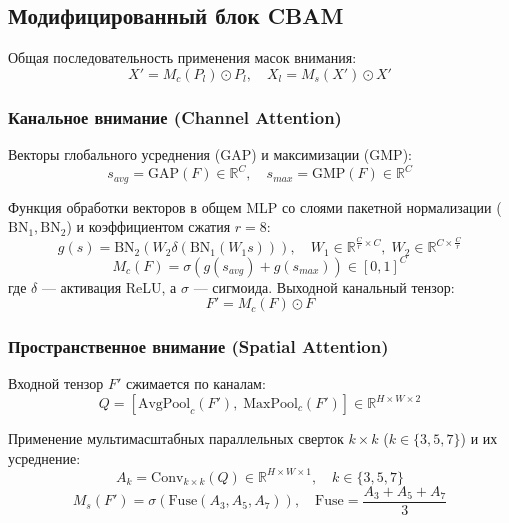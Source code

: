 \documentclass[11pt,a4paper]{article}
\begin{document}
\subsection{Модифицированный блок CBAM}
Общая последовательность применения масок внимания:
\begin{equation}
X' = M_c(P_l) \odot P_l, \quad X_l = M_s(X') \odot X'
\end{equation}

\subsubsection*{Канальное внимание (Channel Attention)}
Векторы глобального усреднения (GAP) и максимизации (GMP):
\begin{equation}
s_{avg} = \text{GAP}(F) \in \mathbb{R}^C, \quad s_{max} = \text{GMP}(F) \in \mathbb{R}^C
\end{equation}

Функция обработки векторов в общем MLP со слоями пакетной нормализации ($\text{BN}_1, \text{BN}_2$) и коэффициентом сжатия $r=8$:
\begin{equation}
g(s) = \text{BN}_2\left(W_2 \delta\left(\text{BN}_1\left(W_1 s\right)\right)\right), \quad W_1 \in \mathbb{R}^{\frac{C}{r} \times C}, \; W_2 \in \mathbb{R}^{C \times \frac{C}{r}}
\end{equation}
\begin{equation}
M_c(F) = \sigma\left(g(s_{avg}) + g(s_{max})\right) \in [0, 1]^C
\end{equation}
где $\delta$ — активация ReLU, а $\sigma$ — сигмоида. Выходной канальный тензор:
\begin{equation}
F' = M_c(F) \odot F
\end{equation}

\subsubsection*{Пространственное внимание (Spatial Attention)}
Входной тензор $F'$ сжимается по каналам:
\begin{equation}
Q = \left[\text{AvgPool}_c(F'), \; \text{MaxPool}_c(F')\right] \in \mathbb{R}^{H \times W \times 2}
\end{equation}

Применение мультимасштабных параллельных сверток $k \times k$ ($k \in \{3, 5, 7\}$) и их усреднение:
\begin{equation}
A_k = \text{Conv}_{k \times k}(Q) \in \mathbb{R}^{H \times W \times 1}, \quad k \in \{3, 5, 7\}
\end{equation}
\begin{equation}
M_s(F') = \sigma\left(\text{Fuse}(A_3, A_5, A_7)\right), \quad \text{Fuse} = \frac{A_3 + A_5 + A_7}{3}
\end{equation}
\end{document}
